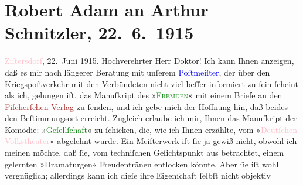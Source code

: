 

               \section[Robert Adam an Arthur Schnitzler, 22. 6. 1915]{ Robert Adam an Arthur Schnitzler, 22. 6. 1915}\nopagebreak{}\rehead{ }\normalsize\beginnumbering{} \toendnotes[C]{\smallbreak\pagebreak[2]} 
\toendnotes[C]{\smallbreak}\pstart
           \raggedleft{}{\pb}\textcolor{pink}{Ziſtersdorf}{}\ledrightnote{\textcolor{pink}{Zistersdorf}}, 22. Juni 1915. \pend
           \pstart{}Hochverehrter Herr Doktor!\pend\pstart
           Ich kann Ihnen anzeigen, daß es mir nach längerer Beratung mit unſerem \textcolor{blue}{Poſtmeiſter}{}, der über den
                    Kriegspoſtverkehr mit den Verbündeten nicht viel beſſer informiert zu ſein
                    ſcheint als ich, gelungen iſt, das Manuſkript des »\textcolor{green}{\textsc{Fremden}}{}\ledrightnote{\textcolor{green}{Der Fremde}}« mit einem Briefe an den \textcolor{brown}{Fiſcherſchen
                        Verlag}{}\ledrightnote{\textcolor{brown}{S. Fischer Verlag}} zu ſenden, und ich gebe mich der Hoffnung hin, daß beides den
                    Beſtimmungsort erreicht.\pend
           \pstart
           Zugleich erlaube ich mir, Ihnen das Manuſkript der Komödie: »\textcolor{green}{Geſellſchaft}{}\ledrightnote{\textcolor{green}{Gesellschaft [Eine Gaunerkomödie]}}« zu ſchicken, die, wie ich Ihnen erzählte, vom
                        »\textcolor{pink}{Deutſchen Volkstheater}{}\ledrightnote{\textcolor{pink}{Volkstheater}}« abgelehnt wurde.
                    Ein Meiſterwerk iſt ſie ja gewiß nicht, obwohl ich meinen möchte, daß ſie, vom
                    techniſchen Geſichtspunkt aus betrachtet, einem gelernten »Dramaturgen«
                    Freudentränen entlocken könnte. Aber ſie iſt {\pb}wohl
                    vergnüglich; allerdings kann ich dieſe ihre Eigenſchaft ſelbſt nicht objektiv
